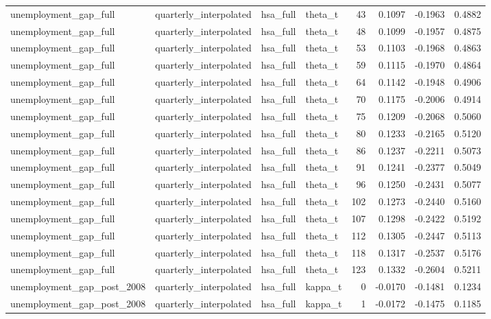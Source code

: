 \begin{tabular}{llllrrrr}
unemployment\_gap\_full & quarterly\_interpolated & hsa\_full & theta\_t & 43 & 0.1097 & -0.1963 & 0.4882 \\
unemployment\_gap\_full & quarterly\_interpolated & hsa\_full & theta\_t & 48 & 0.1099 & -0.1957 & 0.4875 \\
unemployment\_gap\_full & quarterly\_interpolated & hsa\_full & theta\_t & 53 & 0.1103 & -0.1968 & 0.4863 \\
unemployment\_gap\_full & quarterly\_interpolated & hsa\_full & theta\_t & 59 & 0.1115 & -0.1970 & 0.4864 \\
unemployment\_gap\_full & quarterly\_interpolated & hsa\_full & theta\_t & 64 & 0.1142 & -0.1948 & 0.4906 \\
unemployment\_gap\_full & quarterly\_interpolated & hsa\_full & theta\_t & 70 & 0.1175 & -0.2006 & 0.4914 \\
unemployment\_gap\_full & quarterly\_interpolated & hsa\_full & theta\_t & 75 & 0.1209 & -0.2068 & 0.5060 \\
unemployment\_gap\_full & quarterly\_interpolated & hsa\_full & theta\_t & 80 & 0.1233 & -0.2165 & 0.5120 \\
unemployment\_gap\_full & quarterly\_interpolated & hsa\_full & theta\_t & 86 & 0.1237 & -0.2211 & 0.5073 \\
unemployment\_gap\_full & quarterly\_interpolated & hsa\_full & theta\_t & 91 & 0.1241 & -0.2377 & 0.5049 \\
unemployment\_gap\_full & quarterly\_interpolated & hsa\_full & theta\_t & 96 & 0.1250 & -0.2431 & 0.5077 \\
unemployment\_gap\_full & quarterly\_interpolated & hsa\_full & theta\_t & 102 & 0.1273 & -0.2440 & 0.5160 \\
unemployment\_gap\_full & quarterly\_interpolated & hsa\_full & theta\_t & 107 & 0.1298 & -0.2422 & 0.5192 \\
unemployment\_gap\_full & quarterly\_interpolated & hsa\_full & theta\_t & 112 & 0.1305 & -0.2447 & 0.5113 \\
unemployment\_gap\_full & quarterly\_interpolated & hsa\_full & theta\_t & 118 & 0.1317 & -0.2537 & 0.5176 \\
unemployment\_gap\_full & quarterly\_interpolated & hsa\_full & theta\_t & 123 & 0.1332 & -0.2604 & 0.5211 \\
unemployment\_gap\_post\_2008 & quarterly\_interpolated & hsa\_full & kappa\_t & 0 & -0.0170 & -0.1481 & 0.1234 \\
unemployment\_gap\_post\_2008 & quarterly\_interpolated & hsa\_full & kappa\_t & 1 & -0.0172 & -0.1475 & 0.1185 \\

\end{tabular}
